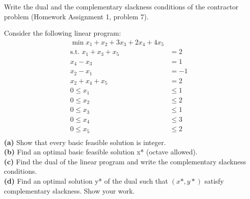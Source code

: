\documentclass[fleqn]{homework}
\begin{document}
  \begin{problem}{4}
    \begin{question}
      Write the dual and the complementary slackness conditions of the
      contractor problem (Homework Assignment 1, problem 7).
    \end{question}
  \end{problem}

  \begin{problem}{5}
    \begin{question}
      Consider the following linear program:
      \begin{align*}
        \min x_1 + x_2 + 3x_3 + 2x_4 + 4x_5 & \\
        \text{s.t. } x_1 + x_3 + x_5 &= 2 \\
        x_4 - x_3 &= 1 \\
        x_2 - x_1 &= -1 \\
        x_2 + x_4 + x_5 &= 2 \\
        0 \le x_1 &\le 1 \\
        0 \le x_2 &\le 2 \\
        0 \le x_3 &\le 1 \\
        0 \le x_4 &\le 3 \\
        0 \le x_5 &\le 2 \\
      \end{align*}
      \textbf{(a)} Show that every basic feasible solution is integer.\\
      \textbf{(b)} Find an optimal basic feasible solution x* (octave allowed).\\
      \textbf{(c)} Find the dual of the linear program and write the
      complementary slackness conditions.\\
      \textbf{(d)} Find an optimal solution y* of the dual such that $(x*, y*)$
      satisfy complementary slackness. Show your work.\\
    \end{question}
  \end{problem}
\end{document}

